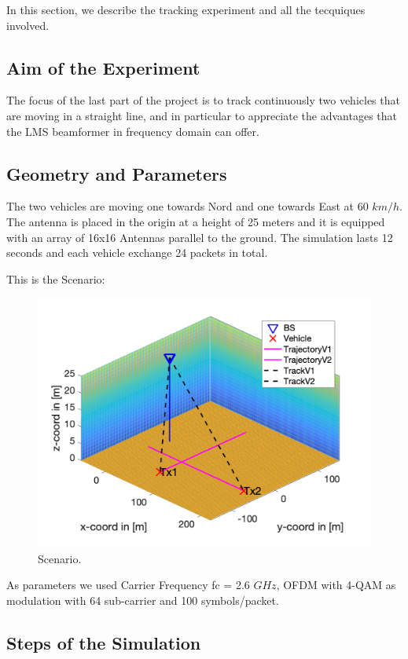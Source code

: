 In this section, we describe the tracking experiment and all the tecquiques involved.

\subsection{Aim of the Experiment}

The focus of the last part of the project is to track continuously two vehicles that are moving in a straight line,
and in particular to appreciate the advantages that the LMS beamformer in frequency domain can offer.

\subsection{Geometry and Parameters}
The two vehicles are moving one towards Nord and one towards East at 60 $km/h$. The antenna is placed in the origin at a height of 25 meters
and it is equipped with an array of 16x16 Antennas parallel to the ground. The simulation lasts 12 seconds and each vehicle 
exchange 24 packets in total.

This is the Scenario:

\begin{figure}[ht]
\includegraphics[width=\linewidth]{Quadriga1.png}
  \caption{Scenario.}
  \label{fig:Scenario}
\end{figure}

As parameters we used Carrier Frequency fc = 2.6 $GHz$, OFDM with 4-QAM as modulation with 64 sub-carrier and 100 symbols/packet.

\subsection{Steps of the Simulation}

